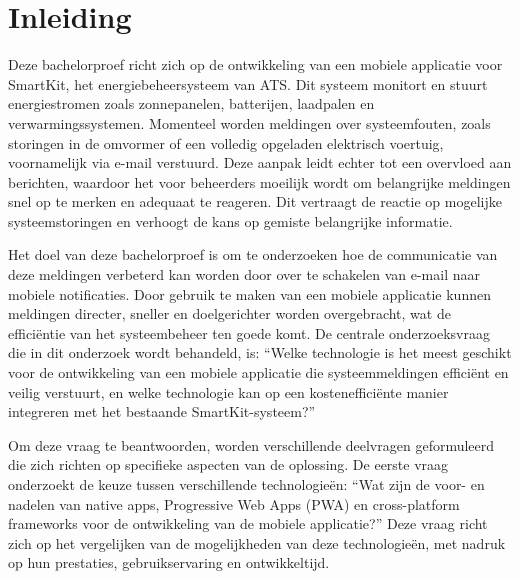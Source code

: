 


% 

\section{Inleiding}%
\label{sec:inleiding}

Deze bachelorproef richt zich op de ontwikkeling van een mobiele applicatie voor SmartKit, het energiebeheersysteem van ATS. Dit systeem monitort en stuurt energiestromen zoals zonnepanelen, batterijen, laadpalen en verwarmingssystemen. Momenteel worden meldingen over systeemfouten, zoals storingen in de omvormer of een volledig opgeladen elektrisch voertuig, voornamelijk via e-mail verstuurd. Deze aanpak leidt echter tot een overvloed aan berichten, waardoor het voor beheerders moeilijk wordt om belangrijke meldingen snel op te merken en adequaat te reageren. Dit vertraagt de reactie op mogelijke systeemstoringen en verhoogt de kans op gemiste belangrijke informatie.

Het doel van deze bachelorproef is om te onderzoeken hoe de communicatie van deze meldingen verbeterd kan worden door over te schakelen van e-mail naar mobiele notificaties. Door gebruik te maken van een mobiele applicatie kunnen meldingen directer, sneller en doelgerichter worden overgebracht, wat de efficiëntie van het systeembeheer ten goede komt. De centrale onderzoeksvraag die in dit onderzoek wordt behandeld, is: “Welke technologie is het meest geschikt voor de ontwikkeling van een mobiele applicatie die systeemmeldingen efficiënt en veilig verstuurt, en welke technologie kan op een kostenefficiënte manier integreren met het bestaande SmartKit-systeem?”

Om deze vraag te beantwoorden, worden verschillende deelvragen geformuleerd die zich richten op specifieke aspecten van de oplossing. De eerste vraag onderzoekt de keuze tussen verschillende technologieën: “Wat zijn de voor- en nadelen van native apps, Progressive Web Apps (PWA) en cross-platform frameworks voor de ontwikkeling van de mobiele applicatie?” Deze vraag richt zich op het vergelijken van de mogelijkheden van deze technologieën, met nadruk op hun prestaties, gebruikservaring en ontwikkeltijd.

